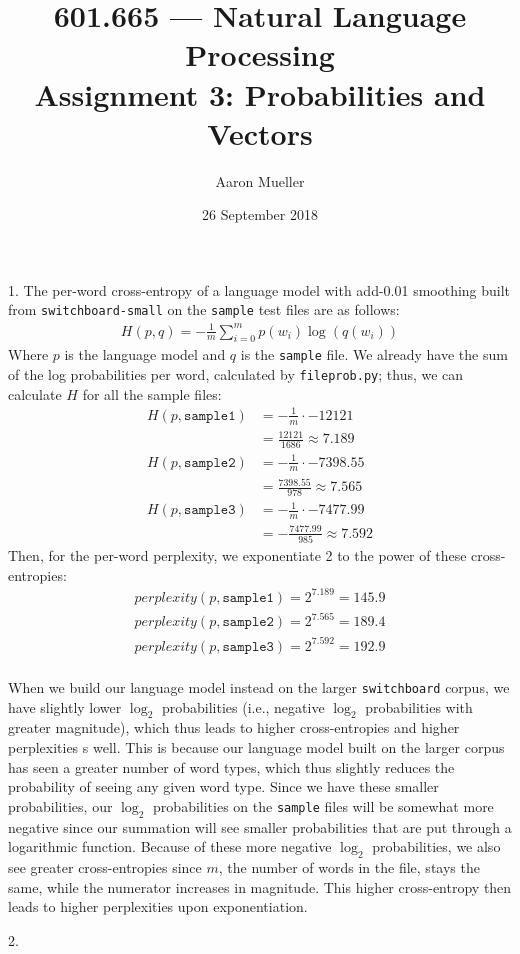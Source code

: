 \documentclass[11pt]{article}
\title{601.665 --- Natural Language Processing\\Assignment 3: Probabilities and Vectors}
\author{Aaron Mueller}
\date{26 September 2018}
\begin{document}
\maketitle

1. The per-word cross-entropy of a language model with add-0.01 smoothing built from
\texttt{switchboard-small} on the \texttt{sample} test files are as follows:
\begin{align*}
H(p,q) = -\frac{1}{m}\sum_{i=0}^m p(w_i)\log(q(w_i))
\end{align*}
Where $p$ is the language model and $q$ is the \texttt{sample} file. We already have the
sum of the log probabilities per word, calculated by \texttt{fileprob.py};
thus, we can calculate $H$ for all the sample files:
\begin{align*}
H(p,\texttt{sample1}) &= -\frac{1}{m}\cdot-12121\\
&= \frac{12121}{1686} \approx 7.189\\
H(p,\texttt{sample2}) &= -\frac{1}{m}\cdot-7398.55\\
&= \frac{7398.55}{978} \approx 7.565\\
H(p,\texttt{sample3}) &= -\frac{1}{m}\cdot-7477.99\\
&= -\frac{7477.99}{985} \approx 7.592
\end{align*}
Then, for the per-word perplexity, we exponentiate 2 to the power of these cross-entropies:
\begin{align*}
perplexity(p,\texttt{sample1}) = 2^{7.189} = 145.9\\
perplexity(p,\texttt{sample2}) = 2^{7.565} = 189.4\\
perplexity(p,\texttt{sample3}) = 2^{7.592} = 192.9\\
\end{align*}

When we build our language model instead on the larger \texttt{switchboard} corpus, we have
slightly lower $\log_2$ probabilities (i.e., negative $\log_2$ probabilities with
greater magnitude), which thus leads to higher cross-entropies and higher perplexities
s well. This is because our language model built on the larger corpus has seen a greater
number of word types, which thus slightly reduces the probability of seeing any given word
type. Since we have these smaller probabilities, our $\log_2$ probabilities on the
\texttt{sample} files will be somewhat more negative since our summation will see smaller
probabilities that are put through a logarithmic function. Because of these more
negative $\log_2$ probabilities, we also see greater cross-entropies since $m$, the
number of words in the file, stays the same, while the numerator increases in magnitude.
This higher cross-entropy then leads to higher perplexities upon exponentiation.
\pagebreak

2. 
\end{document}
